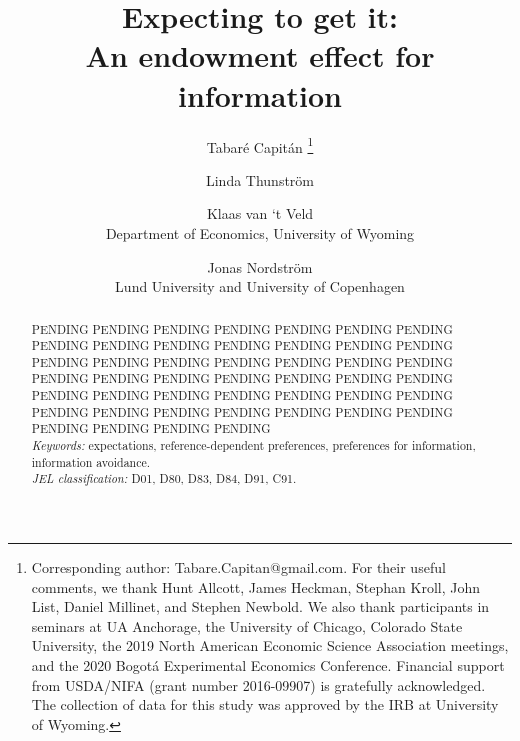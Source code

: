 \documentclass[12pt]{article}
\begin{document}

\title{\vspace{-3cm}
      Expecting to get it: \\ An endowment effect for information
      }

\author{Tabaré Capitán
          \thanks{Corresponding author: Tabare.Capitan@gmail.com. For their useful comments, we thank Hunt Allcott, James Heckman, Stephan Kroll, John List, Daniel Millinet, and Stephen Newbold. We also thank participants in seminars at UA Anchorage, the University of Chicago, Colorado State University, the 2019 North American Economic Science Association meetings, and the 2020 Bogotá Experimental Economics Conference. Financial support from USDA/NIFA (grant number 2016-09907) is gratefully acknowledged. The collection of data for this study was approved by the IRB at University of Wyoming.}
        \and
        Linda Thunström
        \and
        Klaas van ‘t Veld
          \\ \small{Department of Economics, University of Wyoming}
        \and
        Jonas Nordström
          \\ \small{Lund University and University of Copenhagen}
        }

\maketitle

\thispagestyle{empty}   %

\begin{abstract}

\noindent
PENDING PENDING PENDING PENDING PENDING PENDING PENDING PENDING PENDING PENDING PENDING PENDING PENDING PENDING PENDING PENDING PENDING PENDING PENDING PENDING PENDING PENDING PENDING PENDING PENDING PENDING PENDING PENDING PENDING PENDING PENDING PENDING PENDING PENDING PENDING PENDING PENDING PENDING PENDING PENDING PENDING PENDING PENDING PENDING PENDING PENDING
\\
\textit{Keywords:} expectations, reference-dependent preferences, preferences for information, information avoidance.
\\
\textit{JEL classification:} D01, D80, D83, D84, D91, C91.

\end{abstract}
\end{document}
